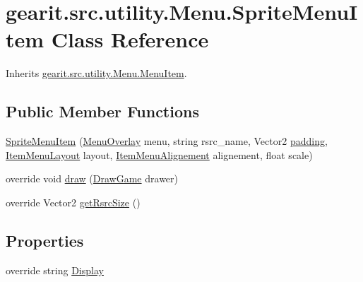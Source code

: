 \hypertarget{classgearit_1_1src_1_1utility_1_1_menu_1_1_sprite_menu_item}{\section{gearit.\+src.\+utility.\+Menu.\+Sprite\+Menu\+Item Class Reference}
\label{classgearit_1_1src_1_1utility_1_1_menu_1_1_sprite_menu_item}
}


Inherits \hyperlink{classgearit_1_1src_1_1utility_1_1_menu_1_1_menu_item}{gearit.\+src.\+utility.\+Menu.\+Menu\+Item}.

\subsection*{Public Member Functions}
\begin{DoxyCompactItemize}
\item 
\hyperlink{classgearit_1_1src_1_1utility_1_1_menu_1_1_sprite_menu_item_aeb2604517fcbc3e1bd415dbdcdff49d5}{Sprite\+Menu\+Item} (\hyperlink{classgearit_1_1src_1_1utility_1_1_menu_1_1_menu_overlay}{Menu\+Overlay} menu, string rsrc\+\_\+name, Vector2 \hyperlink{classgearit_1_1src_1_1utility_1_1_menu_1_1_menu_item_ae2a8172ef48a64fbb99dfca22e9995ab}{padding}, \hyperlink{namespacegearit_1_1src_1_1utility_1_1_menu_a3ca3e98c7e2f44227e0fd6263822c56a}{Item\+Menu\+Layout} layout, \hyperlink{namespacegearit_1_1src_1_1utility_1_1_menu_a4312fcb06a1685782d1246bfeefdbd3b}{Item\+Menu\+Alignement} alignement, float scale)
\item 
override void \hyperlink{classgearit_1_1src_1_1utility_1_1_menu_1_1_sprite_menu_item_a40c8c19036ed62dcb3d63f00b8a0967b}{draw} (\hyperlink{classgearit_1_1src_1_1_draw_game}{Draw\+Game} drawer)
\item 
override Vector2 \hyperlink{classgearit_1_1src_1_1utility_1_1_menu_1_1_sprite_menu_item_af402dd57d83d64a66a0f859b1eee9c2d}{get\+Rsrc\+Size} ()
\end{DoxyCompactItemize}
\subsection*{Properties}
\begin{DoxyCompactItemize}
\item 
override string \hyperlink{classgearit_1_1src_1_1utility_1_1_menu_1_1_sprite_menu_item_af5852c6c33f78ecd692bd13286b84d43}{Display}
\end{DoxyCompactItemize}
